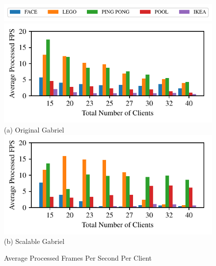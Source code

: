 \begin{figure}[t]
  \begin{center}
    \includegraphics[width=\linewidth]{FIGS/fig-alloc-latency-legend.pdf}
    \includegraphics[width=\linewidth]{FIGS/fig-alloc-fps-baseline.pdf}
    {\small (a) Original Gabriel}
    \includegraphics[width=\linewidth]{FIGS/fig-alloc-fps-cpushares.pdf}
    {\small (b) Scalable Gabriel}
  \end{center}
\vspace{-0.1in}
  \caption{\small Average Processed Frames Per Second Per Client}
  \label{fig:alloc-fps}
\vspace{-0.1in}
\end{figure}

